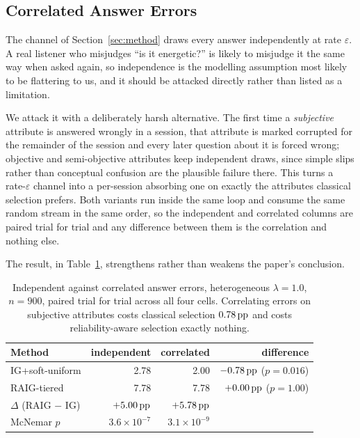\subsection{Correlated Answer Errors}
\label{sec:results-correlated}

The channel of Section~\ref{sec:method} draws every answer independently at
rate $\varepsilon$. A real listener who misjudges ``is it energetic?'' is
likely to misjudge it the same way when asked again, so independence is the
modelling assumption most likely to be flattering to us, and it should be
attacked directly rather than listed as a limitation.

We attack it with a deliberately harsh alternative. The first time a
\emph{subjective} attribute is answered wrongly in a session, that attribute is
marked corrupted for the remainder of the session and every later question
about it is forced wrong; objective and semi-objective attributes keep
independent draws, since simple slips rather than conceptual confusion are the
plausible failure there. This turns a rate-$\varepsilon$ channel into a
per-session absorbing one on exactly the attributes classical selection
prefers. Both variants run inside the same loop and consume the same random
stream in the same order, so the independent and correlated columns are paired
trial for trial and any difference between them is the correlation and nothing
else.

The result, in Table~\ref{tab:correlated}, strengthens rather than weakens the
paper's conclusion.

\begin{table}[t]
\caption{Independent against correlated answer errors, heterogeneous
$\lambda = 1.0$, $n = 900$, paired trial for trial across all four cells.
Correlating errors on subjective attributes costs classical selection
$0.78\,\text{pp}$ and costs reliability-aware selection exactly nothing.}
\label{tab:correlated}
\centering
\footnotesize
\begin{tabular}{@{}lrrr@{}}
\toprule
\textbf{Method} & \textbf{independent} & \textbf{correlated} &
\textbf{difference} \\
\midrule
IG+soft-uniform & 2.78 & 2.00 & $-0.78\,\text{pp}$ ($p = 0.016$) \\
RAIG-tiered     & 7.78 & 7.78 & $+0.00\,\text{pp}$ ($p = 1.00$) \\
\midrule
$\Delta$ (RAIG $-$ IG) & $+5.00\,\text{pp}$ & $+5.78\,\text{pp}$ & \\
McNemar $p$ & $3.6\times10^{-7}$ & $3.1\times10^{-9}$ & \\
\bottomrule
\end{tabular}
\end{table}

